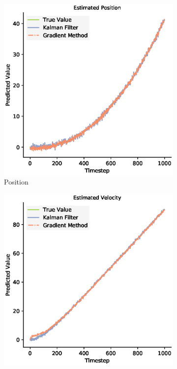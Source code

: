 \begin{figure}[H]
 \begin{subfigure}{0.49\textwidth}
 \centering
 \includegraphics[width=.95\linewidth]{chapter_3_figures/Estimated_Position_NKF.eps}
 \caption{Position}
 \end{subfigure}%
 \begin{subfigure}{0.49\textwidth}
 \centering
 \includegraphics[width=.95\linewidth]{chapter_3_figures/Estimated_Velocity_NKF.eps}

\end{subfigure}
\end{figure}
